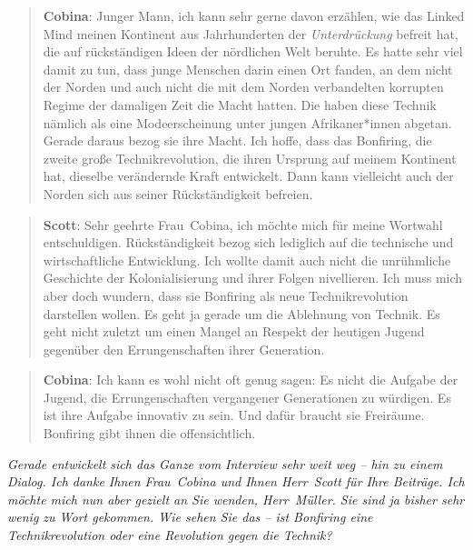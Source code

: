 \documentclass{scrartcl}
\newenvironment{frage}{\itshape}{}
\newenvironment{antworta}{
  \begin{quotation}
  }{
  \end{quotation}
}
\newenvironment{antwortb}{
  \begin{quotation}
  }{
  \end{quotation}
}
\newcommand{\name}[1]{\textbf{#1}}
\begin{document}
\begin{antwortb}
\name{Cobina}: Junger Mann, ich kann sehr gerne davon erzählen, wie
das Linked Mind meinen Kontinent aus Jahrhunderten der
\emph{Unterdrückung} befreit hat, die auf rückständigen Ideen der
nördlichen Welt beruhte. Es hatte sehr viel damit zu tun,
dass junge Menschen darin einen Ort fanden, an dem nicht der
Norden und auch nicht die mit dem Norden verbandelten
korrupten Regime der damaligen Zeit die Macht hatten. Die
haben diese Technik nämlich als eine Modeerscheinung unter
jungen Afrikaner*innen abgetan. Gerade daraus bezog sie ihre
Macht. Ich hoffe, dass das Bonfiring, die zweite große
Technikrevolution, die ihren Ursprung auf meinem Kontinent
hat, dieselbe verändernde Kraft entwickelt. Dann kann
vielleicht auch der Norden sich aus seiner Rückständigkeit
befreien.
\end{antwortb}


\begin{antworta}
\name{Scott}: Sehr geehrte Frau~Cobina, ich möchte mich für meine
Wortwahl entschuldigen. Rückständigkeit bezog sich lediglich
auf die technische und wirtschaftliche Entwicklung. Ich
wollte damit auch nicht die unrühmliche Geschichte der
Kolonialisierung und ihrer Folgen nivellieren. Ich muss mich
aber doch wundern, dass sie Bonfiring als neue
Technikrevolution darstellen wollen. Es geht ja gerade um
die Ablehnung von Technik. Es geht nicht zuletzt um einen
Mangel an Respekt der heutigen Jugend gegenüber den
Errungenschaften ihrer Generation.
\end{antworta}


\begin{antwortb}
\name{Cobina}: Ich kann es wohl nicht oft genug sagen: Es nicht die
Aufgabe der Jugend, die Errungenschaften vergangener
Generationen zu würdigen. Es ist ihre Aufgabe innovativ zu
sein. Und dafür braucht sie Freiräume. Bonfiring gibt ihnen
die offensichtlich.
\end{antwortb}


\begin{frage}
Gerade entwickelt sich das Ganze vom Interview sehr weit weg
– hin zu einem Dialog. Ich danke Ihnen Frau~Cobina und Ihnen
Herr~Scott für Ihre Beiträge. Ich möchte mich nun aber
gezielt an Sie wenden, Herr~Müller. Sie sind ja bisher sehr
wenig zu Wort gekommen. Wie sehen Sie das – ist Bonfiring
eine Technikrevolution oder eine Revolution gegen die
Technik?
\end{frage}
\end{document}
